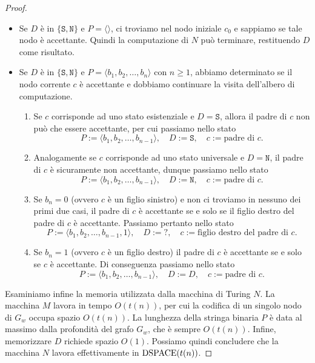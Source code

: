 \begin{proof}
\begin{itemize}
  \item Se $D$ è in $\{\texttt{S}, \texttt{N}\}$ e $P=\langle\rangle$, ci troviamo nel nodo iniziale $c_0$ e sappiamo se tale nodo è accettante. Quindi la computazione di $N$ può terminare, restituendo $D$ come risultato.
  
  \item Se $D$ è in $\{\texttt{S}, \texttt{N}\}$ e $P=\langle b_1, b_2, \ldots, b_n\rangle$ con $n\geq 1$, abbiamo determinato se il nodo corrente $c$ è accettante e dobbiamo continuare la visita dell'albero di computazione.
  \begin{enumerate}
    \item Se $c$ corrisponde ad uno stato esistenziale e $D=\texttt{S}$, allora il padre di $c$ non può che essere accettante, per cui passiamo nello stato
    \[ P := \langle b_1, b_2, \ldots, b_{n-1} \rangle, \quad D := \texttt{S}, \quad c := \text{padre di $c$}. \]
    
    \item Analogamente se $c$ corrisponde ad uno stato universale e $D=\texttt{N}$, il padre di $c$ è sicuramente non accettante, dunque passiamo nello stato
    \[ P := \langle b_1, b_2, \ldots, b_{n-1} \rangle, \quad D := \texttt{N}, \quad c := \text{padre di $c$}. \]
    
    \item Se $b_n=0$ (ovvero $c$ è un figlio sinistro) e non ci troviamo in nessuno dei primi due casi,
    il padre di $c$ è accettante se e solo se il figlio destro del padre di $c$ è accettante.
    Passiamo pertanto nello stato
    \[ P := \langle b_1, b_2, \ldots, b_{n-1}, 1 \rangle, \quad D := \texttt{?}, \quad c := \text{figlio destro del padre di $c$}. \]
    
    \item Se $b_n=1$ (ovvero $c$ è un figlio destro) il padre di $c$ è accettante se e solo se $c$ è accettante.
    Di conseguenza passiamo nello stato
    \[ P := \langle b_1, b_2, \ldots, b_{n-1} \rangle, \quad D := D, \quad c := \text{padre di $c$}. \]
  \end{enumerate}
 \end{itemize}

 Esaminiamo infine la memoria utilizzata dalla macchina di Turing $N$.
 La macchina $M$ lavora in tempo $O(t(n))$, per cui la codifica di un singolo nodo di $G_w$ occupa spazio $O(t(n))$.
 La lunghezza della stringa binaria $P$ è data al massimo dalla profondità del grafo $G_w$, che è sempre $O(t(n))$.
 Infine, memorizzare $D$ richiede spazio $O(1)$.
 Possiamo quindi concludere che la macchina $N$ lavora effettivamente in $\operatorname{DSPACE}(t(n))$.
 
\end{proof}


